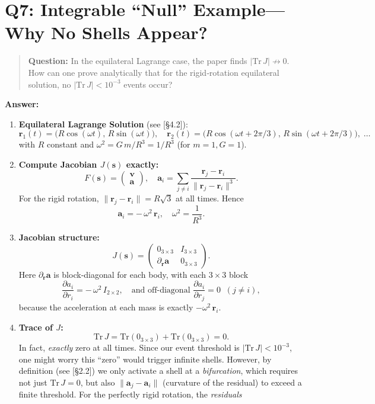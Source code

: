 \documentclass[11pt]{article}
\begin{document}
\section*{Q7: Integrable “Null” Example—Why No Shells Appear?}
\begin{quote}
\textbf{Question:} In the equilateral Lagrange case, the paper finds $|\mathrm{Tr}\,J|\not\to0$. How can one prove analytically that for the rigid‐rotation equilateral solution, no $|\mathrm{Tr}\,J|<10^{-3}$ events occur?
\end{quote}

\noindent\textbf{Answer:}  
\begin{enumerate}[itemsep=0.5em]
  \item \textbf{Equilateral Lagrange Solution} (see [§4.2]):  
    \[
      \mathbf r_1(t) 
      = \bigl(R\cos(\omega t),\,R\sin(\omega t)\bigr),\quad
      \mathbf r_2(t)=\bigl(R\cos(\omega t + 2\pi/3),\,R\sin(\omega t + 2\pi/3)\bigr),\;\dots
    \]
    with $R$ constant and $\omega^2=G\,m/R^3=1/R^3$ (for $m=1,G=1$).  
  \item \textbf{Compute Jacobian $J(\mathbf s)$ exactly:}  
    \[
      F(\mathbf s)=\begin{pmatrix}\mathbf v \\ \mathbf a\end{pmatrix},
      \quad
      \mathbf a_i 
      = \sum_{j\neq i} \frac{\mathbf r_j-\mathbf r_i}{\|\mathbf r_j-\mathbf r_i\|^3}.
    \]
    For the rigid rotation, $\|\mathbf r_j-\mathbf r_i\|=R\sqrt{3}$ at all times.  Hence 
    \[
      \mathbf a_i = -\,\omega^2\,\mathbf r_i,\quad
      \omega^2 = \frac{1}{R^3}.
    \]
  \item \textbf{Jacobian structure:}  
    \[
      J(\mathbf s)=
      \begin{pmatrix}
        0_{3\times3} & I_{3\times3} \\
        \partial_{\mathbf r}\mathbf a & 0_{3\times3}
      \end{pmatrix}.
    \]
    Here $\partial_{\mathbf r}\mathbf a$ is block‐diagonal for each body, with each $3\times3$ block
    \[
      \frac{\partial a_i}{\partial r_i} 
      = -\,\omega^2\,I_{2\times2},\quad
      \text{and off‐diagonal } \frac{\partial a_i}{\partial r_j}=0\;\;(j\neq i),
    \]
    because the acceleration at each mass is exactly $-\omega^2\,\mathbf r_i$.  
  \item \textbf{Trace of $J$:}  
    \[
      \mathrm{Tr}\,J 
      = \mathrm{Tr}(0_{3\times3}) + \mathrm{Tr}(0_{3\times3}) = 0.
    \]
    In fact, \emph{exactly} zero at all times.  Since our event threshold is $|\mathrm{Tr}\,J|<10^{-3}$, one might worry this “zero” would trigger infinite shells.  However, by definition (see [§2.2]) we only activate a shell at a \emph{bifurcation}, which requires not just $\mathrm{Tr}\,J=0$, but also $\|\mathbf a_j-\mathbf a_i\|$ (curvature of the residual) to exceed a finite threshold.  For the perfectly rigid rotation, the \emph{residuals} 

\end{enumerate}
\end{document}
